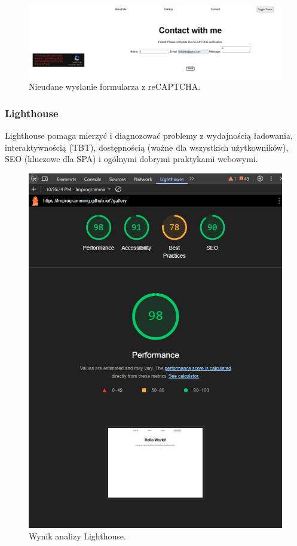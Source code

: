\documentclass[a4paper,12pt]{article}
\begin{document}
\begin{figure}[H]
    \centering
    \includegraphics[width=1\textwidth]{images/contact_failure.png}
    \caption{Nieudane wysłanie formularza z reCAPTCHA.}
\end{figure}

\subsubsection{Lighthouse}

Lighthouse pomaga mierzyć i diagnozować problemy z wydajnością ładowania, interaktywnością (TBT), dostępnością (ważne dla wszystkich użytkowników), SEO (kluczowe dla SPA) i ogólnymi dobrymi praktykami webowymi.

\begin{figure}[H]
    \centering
    \includegraphics[width=1\textwidth]{images/lighthouse.png}
    \caption{Wynik analizy Lighthouse.}
\end{figure}
\end{document}
